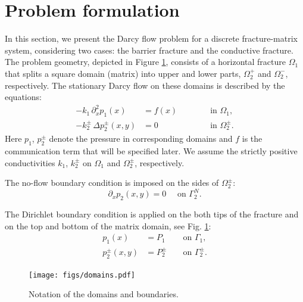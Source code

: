 \documentclass[sn-mathphys,Numbered]{sn-jnl}
\def\Laplace{\Delta}
\def\prtl{\partial} %
\begin{document}
\section{Problem formulation}
\label{sec:setting}
In this section, we present the Darcy flow problem for a discrete fracture-matrix system, considering two cases: the barrier fracture and the conductive fracture. The problem geometry, depicted in Figure \ref{fig:domains}, consists of a horizontal fracture $\Omega_1$ that splits a square domain (matrix) into upper and lower parts, $\Omega_2^+$ and $\Omega_2^-$, respectively.  The stationary Darcy flow on these domains is described by the equations:
\begin{align}
  \label{eq:Darcy_common}
  -k_1\, \partial_x^2 p_1(x) &= f(x) \qquad &&\text{ in }\Omega_1,\\
  -k_2^\pm\, \Laplace p^\pm_2(x,y) &= 0 \qquad &&\text{ in }\Omega_2^\pm.
  \label{eq:Darcy_common_c}
\end{align}
Here $p_1$, $p_2^{\pm}$ denote the pressure in corresponding domains and $f$ is the communication term that will be specified later. 
We assume the strictly positive conductivities $k_1$, $k_2^\pm$  on $\Omega_1$ and $\Omega_2^\pm$, respectively.

The no-flow boundary condition is imposed on the sides of $\Omega_2^\pm$:
\begin{equation}
  \prtl_x p_2(x,y) = 0  \quad\text{ on } \Gamma_2^N.    
  \label{eq:bc_neumann}
\end{equation}

The Dirichlet boundary condition is applied on the both tips of the fracture and on the top and bottom of the matrix domain, see Fig. \ref{fig:domains}:
\begin{align}
  \label{eq:bc_dirichlet_1}
  p_1(x) &= P_1          &&\text{ on } \Gamma_1,\\
  \label{eq:bc_dirichlet_2}
  p_2^\pm(x,y) &= P_2^\pm        &&\text{ on } \Gamma_2^\pm.
\end{align}


\begin{figure}
    \begin{center}
    \texttt{[image: figs/domains.pdf]}
    \caption{Notation of the domains and boundaries.}
    \label{fig:domains}
    \end{center}
\end{figure}
\end{document}
